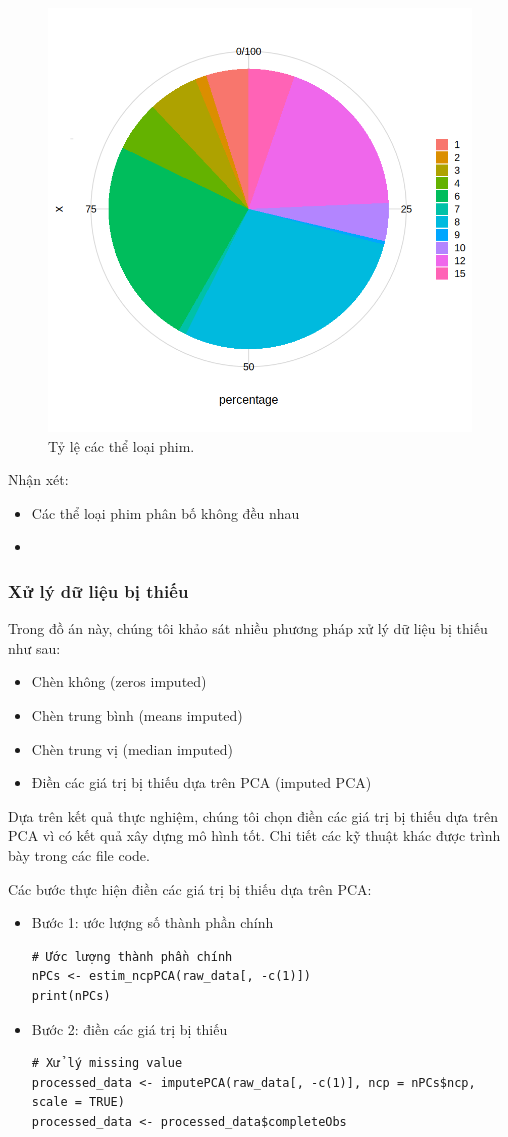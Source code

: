 \begin{figure}[H]
    \centering
    \includegraphics[width=0.75\columnwidth]{csm_figures/genre_part01.png}
    \caption{Tỷ lệ các thể loại phim.}
    \label{fig:genre}
\end{figure}
Nhận xét:
\begin{itemize}
    \item Các thể loại phim phân bố không đều nhau
    \item 
\end{itemize}

\subsubsection{Xử lý dữ liệu bị thiếu}

Trong đồ án này, chúng tôi khảo sát nhiều phương pháp xử lý dữ liệu bị thiếu như sau:
\begin{itemize}
    \item Chèn không (zeros imputed)
    \item Chèn trung bình (means imputed)
    \item Chèn trung vị (median imputed)
    \item Điền các giá trị bị thiếu dựa trên PCA (imputed PCA)
\end{itemize}

Dựa trên kết quả thực nghiệm, chúng tôi chọn điền các giá trị bị thiếu dựa trên PCA vì có kết quả xây dựng mô hình tốt. Chi tiết các kỹ thuật khác được trình bày trong các file code.

Các bước thực hiện điền các giá trị bị thiếu dựa trên PCA:
\begin{itemize}
    \item Bước 1: ước lượng số thành phần chính
\begin{lstlisting}
# Ước lượng thành phần chính
nPCs <- estim_ncpPCA(raw_data[, -c(1)])
print(nPCs)
\end{lstlisting}
    \item Bước 2: điền các giá trị bị thiếu
\begin{lstlisting}
# Xử lý missing value
processed_data <- imputePCA(raw_data[, -c(1)], ncp = nPCs$ncp, scale = TRUE)
processed_data <- processed_data$completeObs
\end{lstlisting}
\end{itemize}

